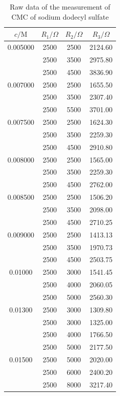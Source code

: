 \documentclass[%
 reprint,
 amsmath,amssymb,
 aps,
]{revtex4-1}
\begin{document}
\begin{table}
\centering
\caption{Raw data of the measurement of CMC of sodium dodecyl sulfate}
\begin{tabular}{cccc}\hline
$c/\mathrm{M}$ & $R_1/\Omega$ &$R_2/\Omega$ & $R_3/\Omega$ \\\hline 
 0.005000 & 2500 & 2500 & 2124.60 \\
 		 & 2500 & 3500 & 2975.80 \\
 		 & 2500 & 4500 & 3836.90 \\\hline
 0.007000 & 2500 & 2500 & 1655.50 \\
 		 & 2500 & 3500 & 2307.40 \\
 		 & 2500 & 5500 & 3701.00 \\\hline
 0.007500 & 2500 & 2500 & 1624.30 \\
 		 & 2500 & 3500 & 2259.30 \\
 		 & 2500 & 4500 & 2910.80 \\\hline
 0.008000 & 2500 & 2500 & 1565.00 \\
 		 & 2500 & 3500 & 2259.30 \\
 		 & 2500 & 4500 & 2762.00 \\\hline
 0.008500 & 2500 & 2500 & 1506.20 \\
 		 & 2500 & 3500 & 2098.00 \\
 		 & 2500 & 4500 & 2710.25 \\\hline
 0.009000 & 2500 & 2500 & 1413.13 \\
 		 & 2500 & 3500 & 1970.73 \\
 		 & 2500 & 4500 & 2503.75 \\\hline
 0.01000 & 2500 & 3000 & 1541.45 \\
 		 & 2500 & 4000 & 2060.05 \\
 		 & 2500 & 5000 & 2560.30 \\\hline
 0.01300 & 2500 & 3000 & 1309.80 \\
 		 & 2500 & 3000 & 1325.00 \\
 		 & 2500 & 4000 & 1766.50 \\
 		 & 2500 & 5000 & 2177.50 \\\hline
 0.01500 & 2500 & 5000 & 2020.00 \\
 		 & 2500 & 6000 & 2400.20 \\
 		 & 2500 & 8000 & 3217.40 \\\hline
\end{tabular}
\label{CMCdata}
\end{table}
\end{document}
